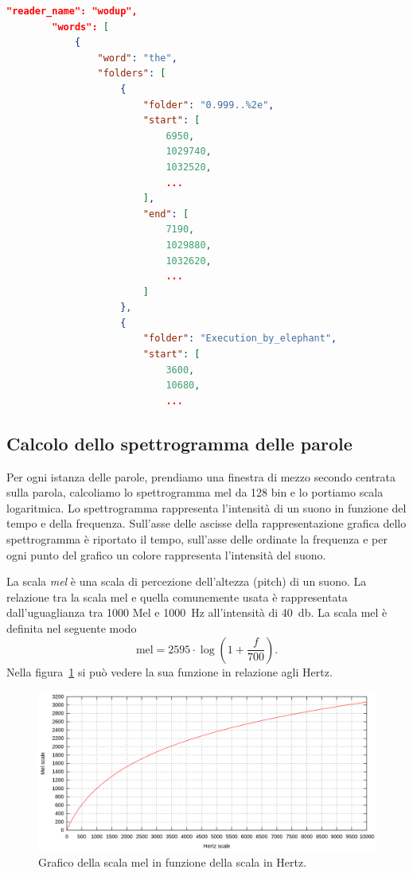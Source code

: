 \documentclass[12pt,a4paper,titlepage]{article}
\begin{document}
\begin{lstlisting}[language=iPython,firstnumber=1, caption=words\_per\_reader.py, label=words_per_reader,captionpos=b]
\end{lstlisting}
	
\begin{lstlisting}[language=json,firstnumber=1, caption=Formato del file readers\_words.json, label=readers_words,captionpos=b]
"reader_name": "wodup",
		"words": [
			{
				"word": "the",
				"folders": [
					{
						"folder": "0.999..%2e",
						"start": [
							6950,
							1029740,
							1032520,
							...
						],
						"end": [
							7190,
							1029880,
							1032620,
							...
						]
					},
					{
						"folder": "Execution_by_elephant",
						"start": [
							3600,
							10680,
							...
\end{lstlisting}

\subsection{Calcolo dello spettrogramma delle parole}
\label{subsec:spettrogramma}
Per ogni istanza delle parole, prendiamo una finestra di mezzo secondo centrata sulla parola, calcoliamo lo spettrogramma mel da 128 bin e lo portiamo scala logaritmica. Lo spettrogramma rappresenta l'intensità di un suono in funzione del tempo e della frequenza. Sull'asse delle ascisse della rappresentazione grafica dello spettrogramma è riportato il tempo, sull'asse delle ordinate la frequenza e per ogni punto del grafico un colore rappresenta l'intensità del suono.

La scala \textit{mel} è una scala di percezione dell'altezza (pitch) di un suono. La relazione tra la scala mel e quella comunemente usata è rappresentata dall'uguaglianza tra 1000 Mel e \SI{1000}{\hertz} all'intensità di \SI{40}{\decibel}. La scala mel è definita nel seguente modo
\begin{equation}
\text{mel} = 2595\cdot \log \left(1 + \dfrac{f}{700} \right).
\end{equation}
Nella figura~\ref{fig:mel_plot} si può vedere la sua funzione in relazione agli Hertz.
\begin{figure}[h]
	\centering	
	\includegraphics[width=1\textwidth]{Immagini/mel_plot}
	\caption{Grafico della scala mel in funzione della scala in Hertz.}
	\label{fig:mel_plot}
\end{figure}
\end{document}
